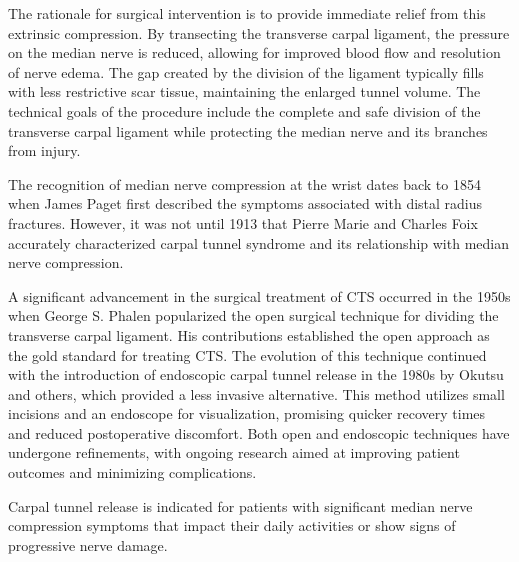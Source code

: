 The rationale for surgical intervention is to provide immediate relief from this extrinsic compression. By transecting the transverse carpal ligament, the pressure on the median nerve is reduced, allowing for improved blood flow and resolution of nerve edema. The gap created by the division of the ligament typically fills with less restrictive scar tissue, maintaining the enlarged tunnel volume. The technical goals of the procedure include the complete and safe division of the transverse carpal ligament while protecting the median nerve and its branches from injury.

The recognition of median nerve compression at the wrist dates back to 1854 when James Paget first described the symptoms associated with distal radius fractures. However, it was not until 1913 that Pierre Marie and Charles Foix accurately characterized carpal tunnel syndrome and its relationship with median nerve compression. 

A significant advancement in the surgical treatment of CTS occurred in the 1950s when George S. Phalen popularized the open surgical technique for dividing the transverse carpal ligament. His contributions established the open approach as the gold standard for treating CTS. The evolution of this technique continued with the introduction of endoscopic carpal tunnel release in the 1980s by Okutsu and others, which provided a less invasive alternative. This method utilizes small incisions and an endoscope for visualization, promising quicker recovery times and reduced postoperative discomfort. Both open and endoscopic techniques have undergone refinements, with ongoing research aimed at improving patient outcomes and minimizing complications.

Carpal tunnel release is indicated for patients with significant median nerve compression symptoms that impact their daily activities or show signs of progressive nerve damage. 

